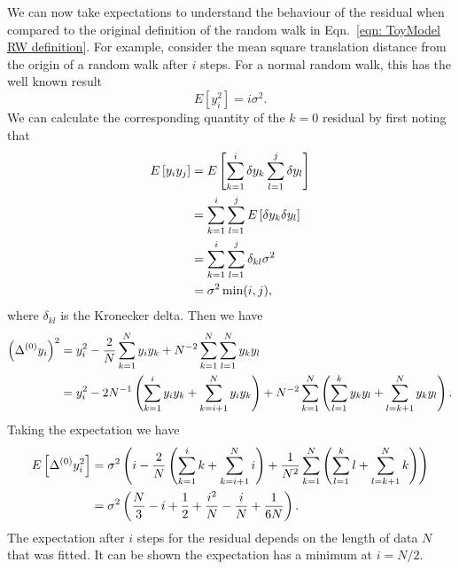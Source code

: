 

We can now take expectations to understand the behaviour of the residual when
compared to the original definition of the random
walk in Eqn.~\ref{eqn: ToyModel RW definition}. For example, consider
the mean square translation distance from the origin of a random walk after $i$
steps. For a normal random walk, this has the well known result
\begin{equation}
E[y_{i}^{2}] = i \sigma^{2}.
\end{equation}
We can calculate the corresponding quantity of the $k=0$ residual by first
noting that
\begin{align}
E\left[y_{i}y_{j}\right] & = E\left[\sum_{k=1}^{i}\delta y_{k} \sum_{l=1}^{j}\delta y_{l} \right] \\
& = \sum_{k=1}^{i}\sum_{l=1}^{j}E\left[\delta y_{k} \delta y_{l}\right] \\
& = \sum_{k=1}^{i}\sum_{l=1}^{j} \delta_{kl} \sigma^{2} \\
& = \sigma^{2}\min(i, j),
\end{align}
where $\delta_{kl}$ is the Kronecker delta. Then we have
\begin{align}
\left(\Delta^{(0)} y_{i}\right)^{2} & = y_{i}^{2} - \frac{2}{N}\sum_{k=1}^{N}y_{i}y_{k} + N^{-2}\sum_{k=1}^{N}\sum_{l=1}^{N}y_{k}y_{l} \\
& =  y_{i}^{2} - 2 N^{-1} \left(\sum_{k=1}^{i}y_{i}y_{k} + \sum_{k=i+1}^{N}y_{i}y_{k} \right)+ N^{-2}\sum_{k=1}^{N}\left(\sum_{l=1}^{k}y_{k}y_{l} + \sum_{l=k+1}^{N}y_{k}y_{l} \right).
\end{align}
Taking the expectation we have
\begin{align}
E\left[\Delta^{(0)} y_{i}^{2} \right] & = \sigma^{2}\left(i - \frac{2}{N}\left(\sum_{k=1}^{i}k + \sum_{k=i+1}^{N}i \right)+ \frac{1}{N^{2}}\sum_{k=1}^{N}\left(\sum_{l=1}^{k}l+ \sum_{l=k+1}^{N}k \right) \right) \\
& = \sigma^{2}\left(\frac{N}{3} - i + \frac{1}{2} + \frac{i^{2}}{N} - \frac{i}{N} + \frac{1}{6 N}\right).
\end{align}
The expectation after $i$ steps for the residual depends on the length of data
$N$ that was fitted. It can be shown the expectation has a minimum at $i=N/2$.

